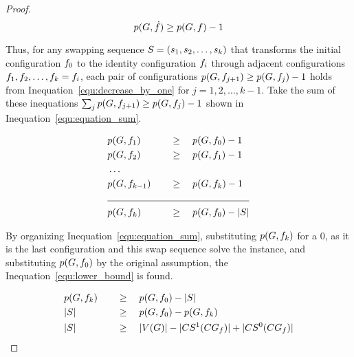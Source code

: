 \documentclass[msc]{ppgccufmg}    %
\begin{document}
\begin{proof}
    \begin{equation}
        \centering
        \label{equ:decrease_by_one}
        \applyFunc{p}{\graphG, \sub{\mapFunc}} \geq \applyFunc{p}{\graphG, \mapFunc} - 1
    \end{equation}
    
    Thus, for any swapping sequence $S = (s_1, s_2, \ldots, 
    s_k)$ that transforms the initial configuration $f_{0}$ to the identity
    configuration $f_{i}$ through adjacent configurations $f_{1}, f_2,
    \ldots, f_{k} = f_{i}$, each pair of configurations $p(G, 
    f_{j+1}) \geq p(G, f_{j}) -1$ holds from 
    Inequation~\ref{equ:decrease_by_one} for $j = 1,2,\ldots,k-1$.
    Take the sum of these inequations $\sum_{j} p(G, f_{j+1}) \geq p(G, f_{j}) -1$ shown in Inequation~\ref{equ:equation_sum}.
    
    \begin{alignat}{2}
    \centering
    \label{equ:equation_sum}
    & \applyFunc{p}{\graphG, \mapFunc_{1}}  \quad && \geq \quad \applyFunc{p}{\graphG, \mapFunc_{0}} -1 \nonumber \\
    & \applyFunc{p}{\graphG, \mapFunc_{2}} \quad && \geq \quad \applyFunc{p}{\graphG, \mapFunc_{1}} -1 \nonumber \\
    & \ldots \nonumber \\
    & \applyFunc{p}{\graphG, \mapFunc_{k-1}} \quad && \geq \quad \applyFunc{p}{\graphG, \mapFunc_{k}} -1 \nonumber \\
    \cline{1-4}
    & \applyFunc{p}{\graphG, \mapFunc_{k}} \quad && \geq \quad \applyFunc{p}{\graphG, \mapFunc_{0}} - \sizeof{\swapSeq}
    \end{alignat}
    
    By organizing Inequation~\ref{equ:equation_sum}, substituting $p(G, 
    f_{k})$ for a $0$, as it is the last configuration and this swap sequence solve the
    instance, and substituting $p(G, f_{0})$ by the original assumption,
    the Inequation~\ref{equ:lower_bound} is found.
    
    \begin{alignat}{2}
    \centering
    \label{equ:lower_bound}
    & \applyFunc{p}{\graphG, \mapFunc_{k}} \quad && \geq \quad \applyFunc{p}{\graphG, \mapFunc_{0}} - \sizeof{\swapSeq} \nonumber \\
    & \sizeof{\swapSeq} \quad && \geq \quad \applyFunc{p}{\graphG, \mapFunc_{0}} - \applyFunc{p}{\graphG, \mapFunc_{k}} \nonumber \\
    & \sizeof{\swapSeq} \quad && \geq \quad \sizeof{\vertexFunc{\graphG}} - 
\sizeof{\applyFunc{\oneCycles}{\conflictGraph_{\mapFunc}}} +
\sizeof{\applyFunc{\zeroCycles}{\conflictGraph_{\mapFunc}}}
    \end{alignat}
    
\end{proof}
\end{document}
